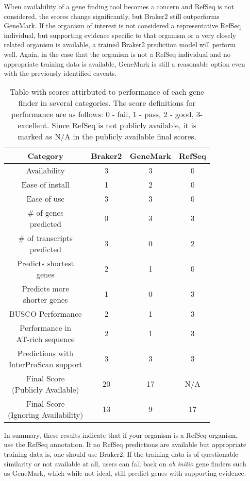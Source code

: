 When availability of a gene finding tool becomes a concern and RefSeq
is not considered, the scores change significantly, but Braker2 still
outperforms GeneMark. If the organism of interest is not considered a
representative RefSeq individual, but supporting evidence specific to
that organism or a very closely related organism is available, a
trained Braker2 prediction model will perform well. Again, in the case
that the organism is not a RefSeq individual and no appropriate
training data is available, GeneMark is still a reasonable option even
with the previously identified caveats.

\begin{table}
  \centering
  \begin{tabular}{|c|c|c|c|}
    \hline
    Category & Braker2 & GeneMark & RefSeq \\ \hline
    Availability & 3 & 3 & 0 \\ \hline
    Ease of install & 1 & 2 & 0 \\ \hline
    Ease of use & 3 & 3 & 0 \\ \hdashline
    \makecell{\# of genes\\predicted} & 0 & 3 & 3 \\ \hline
    \makecell{\# of transcripts\\predicted} & 3 & 0 & 2 \\ \hline
    \makecell{Predicts shortest\\genes} & 2 & 1 & 0 \\ \hline
    \makecell{Predicts more\\shorter genes} & 1 & 0 & 3 \\ \hline
    BUSCO Performance & 2 & 1 & 3 \\ \hline
    \makecell{Performance in\\AT-rich sequence} & 2 & 1 & 3 \\ \hline
    \makecell{Predictions with \\InterProScan support} & 3 & 3 & 3 \\ \hline
    \makecell{Final Score\\(Publicly Available)} & 20 & 17 & N/A \\ \hline
    \makecell{Final Score\\(Ignoring Availability)} & 13 & 9 & 17 \\ \hline
  \end{tabular}
  \caption[Final scoring table]{Table with scores attirbuted to
    performance of each gene finder in several categories. The score
    definitions for performance are as follows: 0 - fail, 1 - pass, 2
    - good, 3-excellent. Since RefSeq is not publicly available, it is
    marked as N/A in the publicly available final scores.}
  \label{table:final-score}
\end{table}

In summary, these results indicate that if your organism is a RefSeq
organism, use the RefSeq annotation. If no RefSeq predictions are
available but appropriate training data is, one should use Braker2. If
the training data is of questionable similarity or not available at
all, users can fall back on \textit{ab initio} gene finders such as
GeneMark, which while not ideal, still predict genes with supporting
evidence.
